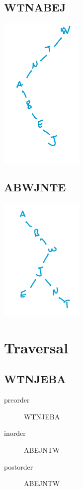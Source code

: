 \documentclass[twoside=false,DIV=14]{scrartcl}
\begin{document}
\subsection{WTNABEJ}
\begin{center}
  \includegraphics[width=0.3\textwidth]{2_2.jpeg}
  \end{center}
 
\subsection{ABWJNTE}
\begin{center}
  \includegraphics[width=0.3\textwidth]{2_3.jpeg}
  \end{center}
 
\section{Traversal}
\subsection{WTNJEBA}
\begin{description}
\item [preorder] WTNJEBA
\item [inorder] ABEJNTW
\item [postorder]ABEJNTW
\end{description}
\end{document}
